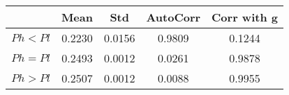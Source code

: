 \begin{tiny}\begin{tabular}{|l|c|c|c|c|}
\hline
&\textbf{Mean}&\textbf{Std}&\textbf{AutoCorr}&\textbf{Corr with g}\\\hline
\textbf{$Ph<Pl$}&0.2230&0.0156&0.9809&0.1244\\\hline
\textbf{$Ph=Pl$}&0.2493&0.0012&0.0261&0.9878\\\hline
\textbf{$Ph>Pl$}&0.2507&0.0012&0.0088&0.9955\\\hline
\end{tabular}
\end{tiny}
